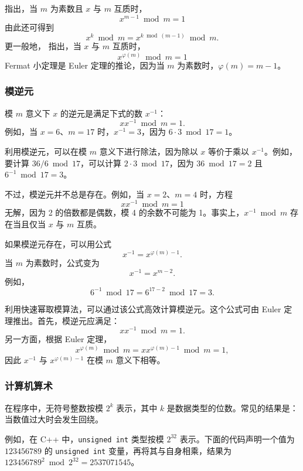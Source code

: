 
指出，当 $m$ 为素数且 $x$ 与 $m$ 互质时，
\[x^{m-1} \bmod m = 1\]
由此还可得到
\[x^k \bmod m = x^{k \bmod (m-1)} \bmod m.\]
更一般地，
指出，当 $x$ 与 $m$ 互质时，
\[x^{\varphi(m)} \bmod m = 1\]
Fermat 小定理是 Euler 定理的推论，因为当 $m$ 为素数时，$\varphi(m)=m-1$。

\subsubsection{模逆元}


模 $m$ 意义下 $x$ 的逆元是满足下式的数 $x^{-1}$：
\[ x x^{-1} \bmod m = 1. \]
例如，当 $x=6$、$m=17$ 时，$x^{-1}=3$，因为 $6\cdot3 \bmod 17=1$。

利用模逆元，可以在模 $m$ 意义下进行除法，因为除以 $x$ 等价于乘以 $x^{-1}$。例如，要计算 $36/6 \bmod 17$，可以计算 $2 \cdot 3 \bmod 17$，因为 $36 \bmod 17 = 2$ 且 $6^{-1} \bmod 17 = 3$。

不过，模逆元并不总是存在。例如，当 $x=2$、$m=4$ 时，方程
\[ x x^{-1} \bmod m = 1 \]
无解，因为 2 的倍数都是偶数，模 4 的余数不可能为 1。事实上，$x^{-1} \bmod m$ 存在当且仅当 $x$ 与 $m$ 互质。

如果模逆元存在，可以用公式
\[
x^{-1} = x^{\varphi(m)-1}.
\]
当 $m$ 为素数时，公式变为
\[
x^{-1} = x^{m-2}.
\]
例如，
\[6^{-1} \bmod 17 =6^{17-2} \bmod 17 = 3.\]

利用快速幂取模算法，可以通过该公式高效计算模逆元。这个公式可由 Euler 定理推出。首先，模逆元应满足：
\[
x x^{-1} \bmod m = 1.
\]
另一方面，根据 Euler 定理，
\[
x^{\varphi(m)} \bmod m =  xx^{\varphi(m)-1} \bmod m = 1,
\]
因此 $x^{-1}$ 与 $x^{\varphi(m)-1}$ 在模 $m$ 意义下相等。

\subsubsection{计算机算术}

在程序中，无符号整数按模 $2^k$ 表示，其中 $k$ 是数据类型的位数。常见的结果是：当数值过大时会发生回绕。

例如，在 C++ 中，\texttt{unsigned int} 类型按模 $2^{32}$ 表示。下面的代码声明一个值为 $123456789$ 的 \texttt{unsigned int} 变量，再将其与自身相乘，结果为 $123456789^2 \bmod 2^{32} = 2537071545$。

